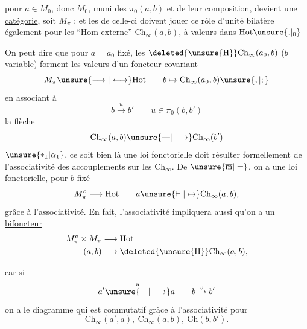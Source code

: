 pour  $a\in M_0$, donc $M_0$, muni des $\pi_0(a,b)$ et de leur composition, devient une \uline{catégorie},  soit $M_{\pi}$ ; et les   de celle-ci doivent jouer ce rôle d'unité bilatère également pour les ``Hom externe'' $\mathrm{Ch}_{\infty}(a,b)$, à valeurs dans $\mathrm{Hot}\unsure{. |{}_{0}}$

On peut dire que pour $a=a_0$ fixé, les  $\deleted{\unsure{\mathrm H}}\mathrm{Ch}_{\infty}(a_0,b)$ ($b$ variable) forment les valeurs d'un \uline{foncteur} covariant
\[
M_{\pi}\unsure{\longrightarrow|\longleftrightarrow}\mathrm{Hot}\qquad b\mapsto\mathrm{Ch}_{\infty}(a_0,b)\unsure{,|;}
\]
 en associant à
\[
b\xrightarrow{u}b'\qquad u\in\pi_0(b,b')
\]
la flèche
\[
\mathrm{Ch}_{\infty}(a,b)\unsure{\text{---}|\longrightarrow}\mathrm{Ch}_{\infty}(b')
\]
 $\unsure{*_1|\alpha_1}$,  ce soit bien là une loi fonctorielle doit résulter formellement de l'associativité des accouplements sur les $\mathrm{Ch}_{\infty}$. De $\unsure{\overline{\mathrm m}|=}$, on a une loi fonctorielle, pour $b$ fixé
\[
M_{\pi}^{o}\longrightarrow\mathrm{Hot}\qquad a\unsure{\vdash|\mapsto}\mathrm{Ch}_{\infty}(a,b),
\]
grâce à l'associativité. En fait, l'associativité impliquera aussi qu'on a un \uline{bifoncteur}
\[
\begin{aligned}
M_{\pi}^{o}\times M_{\pi}&\longrightarrow\mathrm{Hot}\\
(a,b)&\longrightarrow\deleted{\unsure{\mathrm H}}\mathrm{Ch}_{\infty}(a,b),
\end{aligned}
\]

car si
\[
a'\overset{u}{\unsure{\text{---}|\longrightarrow}}a\qquad b\xrightarrow{v}b'
\]
on a le diagramme
qui est commutatif grâce à l'associativité pour
\[
\mathrm{Ch}_{\infty}(a',a),\ \mathrm{Ch}_{\infty}(a,b),\ \mathrm{Ch}(b,b').
\]

